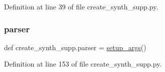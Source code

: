 Definition at line 39 of file create\+\_\+synth\+\_\+supp.\+py.

\mbox{\label{namespacecreate__synth__supp_a4b22ea23245fdb077c1626e7f43fdb0e}} 
\subsubsection{\texorpdfstring{parser}{parser}}
{\footnotesize\ttfamily def create\+\_\+synth\+\_\+supp.\+parser = \hyperlink{namespacecreate__synth__supp_a1d35bf34b52be13a73c4a7b9d2ba0274}{setup\+\_\+args}()}



Definition at line 153 of file create\+\_\+synth\+\_\+supp.\+py.

